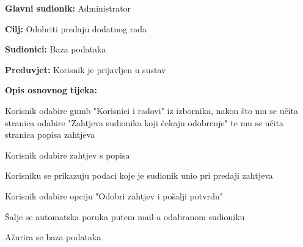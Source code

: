 					\noindent {}
					\begin{packed_item}
	
						\item \textbf{Glavni sudionik: } Administrator
						\item  \textbf{Cilj:} Odobriti predaju dodatnog rada
						\item  \textbf{Sudionici:} Baza podataka
						\item  \textbf{Preduvjet:} Korisnik je prijavljen u sustav
						\item  \textbf{Opis osnovnog tijeka:}
						
						\item[] \begin{packed_enum}
	
							\item Korisnik odabire gumb "Korisnici i radovi" iz izbornika, nakon što mu se učita stranica odabire "Zahtjeva sudionika koji čekaju odobrenje" te mu se učita stranica popisa zahtjeva
							\item Korisnik odabire zahtjev s popisa
							\item Korisniku se prikazuju podaci koje je sudionik unio pri predaji zahtjeva
							\item Korisnik odabire opciju "Odobri zahtjev i pošalji potvrdu"
							\item Šalje se automatska poruka putem mail-a odabranom sudioniku
							\item Ažurira se baza podataka

					
						\end{packed_enum}
			
					\end{packed_item}

